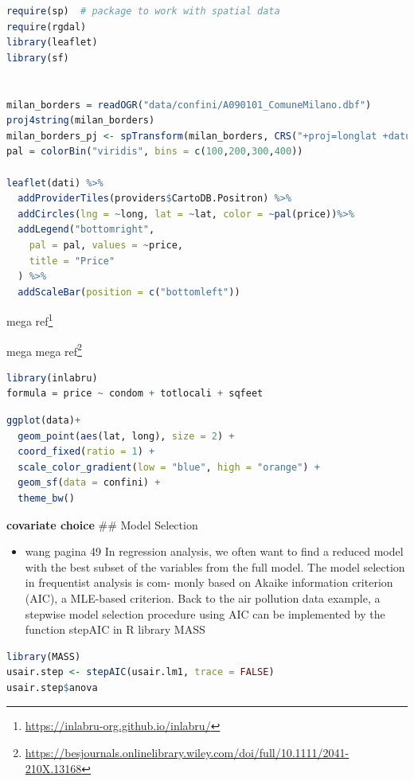 \documentclass[
  12pt,
  a4paper,
  oneside]{book}
\DeclareRobustCommand{\href}[2]{#2\footnote{\url{#1}}}
\providecommand{\tightlist}{%
  \setlength{\itemsep}{0pt}\setlength{\parskip}{0pt}}
\theoremstyle{definition}
\theoremstyle{definition}
\theoremstyle{definition}
\theoremstyle{remark}
\begin{document}
\begin{lstlisting}[language=R]
require(sp)  # package to work with spatial data
require(rgdal)
library(leaflet)
library(sf)


milan_borders = readOGR("data/confini/A090101_ComuneMilano.dbf")
proj4string(milan_borders)
milan_borders_pj <- spTransform(milan_borders, CRS("+proj=longlat +datum=WGS84 +no_defs +ellps=WGS84 +towgs84=0,0,0"))
pal = colorBin("viridis", bins = c(100,200,300,400))

leaflet(dati) %>%
  addProviderTiles(providers$CartoDB.Positron) %>%
  addCircles(lng = ~long, lat = ~lat, color = ~pal(price))%>%
  addLegend("bottomright",
    pal = pal, values = ~price,
    title = "Price"
  ) %>%
  addScaleBar(position = c("bottomleft"))
\end{lstlisting}

\href{https://inlabru-org.github.io/inlabru/}{mega ref}

\href{https://besjournals.onlinelibrary.wiley.com/doi/full/10.1111/2041-210X.13168}{mega mega ref}

\begin{lstlisting}[language=R]
library(inlabru)
formula = price ~ condom + totlocali + sqfeet 
\end{lstlisting}

\begin{lstlisting}[language=R]
ggplot(data)+
  geom_point(aes(lat, long), size = 2) +
  coord_fixed(ratio = 1) +
  scale_color_gradient(low = "blue", high = "orange") +
  geom_sf(data = confini) +
  theme_bw()
\end{lstlisting}

\textbf{covariate choice }
\#\# Model Selection

\begin{itemize}
\tightlist
\item
  wang pagina 49
  In regression analysis, we often want to find a reduced model with the best subset of
  the variables from the full model. The model selection in frequentist analysis is com-
  monly based on Akaike information criterion (AIC), a MLE-based criterion. Back to
  the air pollution data example, a stepwise model selection procedure using AIC can
  be implemented by the function stepAIC in R library MASS
\end{itemize}

\begin{lstlisting}[language=R]
library(MASS)
usair.step <- stepAIC(usair.lm1, trace = FALSE)
usair.step$anova
\end{lstlisting}
\end{document}
